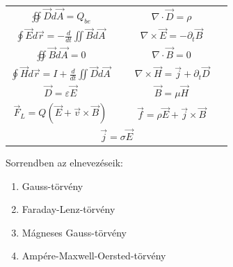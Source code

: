 \documentclass{article}
\begin{document}
\renewcommand{\arraystretch}{2}
\begin{center}
\begin{tabular}{|cc|}
\hline
\multicolumn{1}{|c|}{$\oiint \vec{D} d\vec{A} = Q_{be}$} & $\nabla \cdot \vec{D} = \rho$ \\
\multicolumn{1}{|c|}{$\oint \vec{E} d\vec{r} = -\frac{d}{dt} \iint \vec{B} d\vec{A}$} & $\nabla \times \vec{E} = -\partial_t \vec{B}$ \\
\multicolumn{1}{|c|}{$\oiint \vec{B} d\vec{A} = 0$} & $\nabla \cdot \vec{B} = 0$ \\
\multicolumn{1}{|c|}{$\oint \vec{H} d\vec{r} = I+\frac{d}{dt} \iint \vec{D} d\vec{A}$} & \ \ \ $\nabla \times \vec{H} = \vec{j} + \partial_t \vec{D}$ \ \ \\ \hline
\multicolumn{1}{|c|}{$\vec{D} = \varepsilon \vec{E}$}                                 & \multicolumn{1}{c|}{$\vec{B} = \mu \vec{H}$} \\ \hline
\multicolumn{1}{|c|}{$\vec{F}_L = Q( \vec{E} + \vec{v} \times \vec{B})$}                                 & \multicolumn{1}{c|}{$\vec{f} = \rho \vec{E} + \vec{j} \times \vec{B}$} \\ \hline
\multicolumn{2}{|c|}{$\vec{j} = \sigma \vec{E}$}      \\ \hline
\end{tabular}
\end{center}
Sorrendben az elnevezéseik:
\begin{enumerate}
\item Gauss-törvény
\item Faraday-Lenz-törvény 
\item Mágneses Gauss-törvény 
\item Ampére-Maxwell-Oersted-törvény
\end{enumerate}
\end{document}
